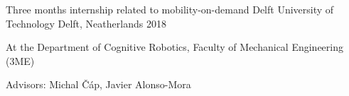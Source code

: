 

\begin{cventries}

  \cventry
    {Three months internship related to mobility-on-demand} %
    {Delft University of Technology} %
    {Delft, Neatherlands} %
    {2018} %
    {
      \begin{cvitems} %
        \item {At the Department of Cognitive Robotics, Faculty of Mechanical Engineering (3ME)}
        \item {Advisors: Michal Čáp, Javier Alonso-Mora}
      \end{cvitems}
    }
    

\end{cventries}
